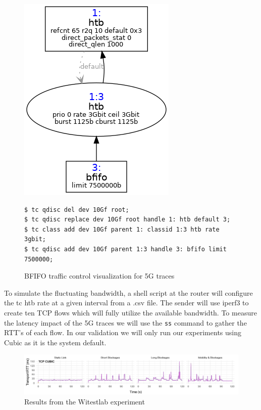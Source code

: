 \documentclass[a4paper,english, 12pt]{report}
\begin{document}
\begin{figure}[h!] %
	\centering
	\includegraphics[scale=0.60]{../diagrams/tc/tc_5g_bfifo.png}
  	\begin{verbatim}
$ tc qdisc del dev 10Gf root; 
$ tc qdisc replace dev 10Gf root handle 1: htb default 3;
$ tc class add dev 10Gf parent 1: classid 1:3 htb rate 3gbit;
$ tc qdisc add dev 10Gf parent 1:3 handle 3: bfifo limit 7500000;
	\end{verbatim}
	\caption{BFIFO traffic control visualization for 5G traces}
  	\label{fig:tc_5g_bfifo}
\end{figure}

To simulate the fluctuating bandwidth, a shell script at the router will configure the tc htb rate at a given interval from a .csv file. The sender will use iperf3 to create ten TCP flows which will fully utilize the available bandwidth. To measure the latency impact of the 5G traces we will use the \verb|ss| command to gather the RTT's of each flow. In our validation we will only run our experiments using Cubic as it is the system default.\\


\begin{figure}[h!] %
	\centering
	\includegraphics[scale=0.3]{../diagrams/witestlab/witestlab_results.png}
  	\caption{Results from the Witestlab experiment~\cite{Srivastava_Fund_Panwar_2020}}
  	\label{fig:witestlab_results}
\end{figure}
\end{document}
